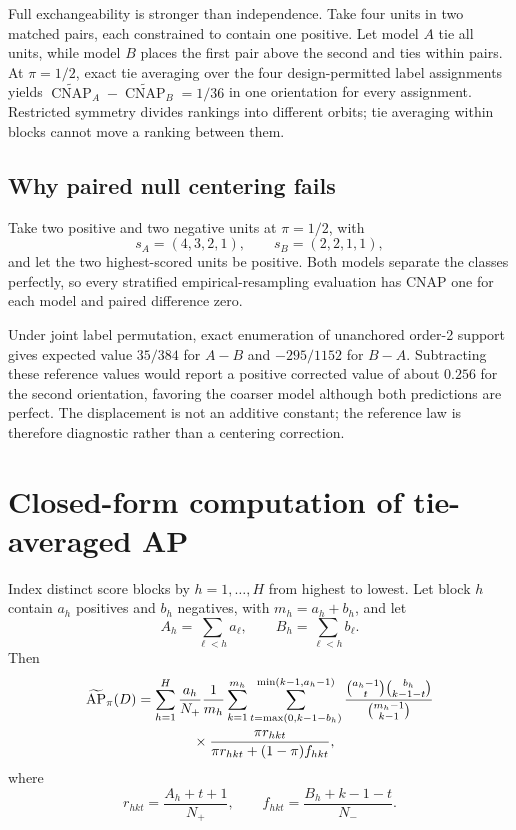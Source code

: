 \documentclass[11pt]{article}
\newcommand{\AP}{\operatorname{AP}}
\newcommand{\CNAP}{\operatorname{CNAP}}
\newcommand{\APta}{\widetilde{\AP}}
\newcommand{\CNAPta}{\widetilde{\CNAP}}
\theoremstyle{remark}
\begin{document}
Full exchangeability is stronger than independence. Take four units in two
matched pairs, each constrained to contain one positive. Let model $A$ tie all
units, while model $B$ places the first pair above the second and ties within
pairs. At $\pi=1/2$, exact tie averaging over the four design-permitted label
assignments yields $\CNAPta_A-\CNAPta_B=1/36$ in one orientation for every
assignment. Restricted symmetry divides rankings into different orbits; tie
averaging within blocks cannot move a ranking between them.

\subsection{Why paired null centering fails}

Take two positive and two negative units at $\pi=1/2$, with
\[
s_A=(4,3,2,1),
\qquad
s_B=(2,2,1,1),
\]
and let the two highest-scored units be positive. Both models separate the
classes perfectly, so every stratified empirical-resampling evaluation has
CNAP one for each model and paired difference zero.

Under joint label permutation, exact enumeration of unanchored order-2 support
gives expected value $35/384$ for $A-B$ and $-295/1152$ for $B-A$.
Subtracting these reference values would report a positive corrected value of
about $0.256$ for the second orientation, favoring the coarser model although
both predictions are perfect. The displacement is not an additive constant;
the reference law is therefore diagnostic rather than a centering correction.


\section{Closed-form computation of tie-averaged AP}
\label{app:tie-computation}

Index distinct score blocks by $h=1,\ldots,H$ from highest to lowest. Let block
$h$ contain $a_h$ positives and $b_h$ negatives, with $m_h=a_h+b_h$, and let
\[
A_h=\sum_{\ell<h}a_\ell,
\qquad
B_h=\sum_{\ell<h}b_\ell.
\]
Then
\begin{align}
\APta_\pi(D)
&=
\sum_{h=1}^H
\frac{a_h}{N_+}\frac1{m_h}
\sum_{k=1}^{m_h}
\sum_{t=\max(0,k-1-b_h)}^{\min(k-1,a_h-1)}
\frac{\binom{a_h-1}{t}\binom{b_h}{k-1-t}}
{\binom{m_h-1}{k-1}}
\notag\\
&\qquad\qquad\times
\frac{\pi r_{hkt}}
{\pi r_{hkt}+(1-\pi)f_{hkt}},
\label{eq:tie-closed}
\end{align}
where
\[
r_{hkt}=\frac{A_h+t+1}{N_+},
\qquad
f_{hkt}=\frac{B_h+k-1-t}{N_-}.
\]
\end{document}
